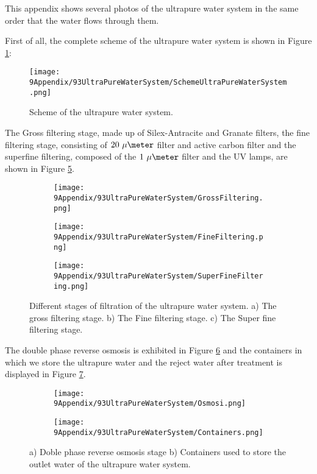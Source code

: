 This appendix shows several photos of the ultrapure water system in the same order that the water flows through them.

First of all, the complete scheme of the ultrapure water system is shown in Figure \ref{fig:SchemeUPWS}:

\begin{figure}[htbp]
\centering
\texttt{[image: 9Appendix/93UltraPureWaterSystem/SchemeUltraPureWaterSystem.png]}
\caption{Scheme of the ultrapure water system.\label{fig:SchemeUPWS}}
\end{figure}

The Gross filtering stage, made up of Silex-Antracite and Granate filters, the fine filtering stage, consisting of $20~\mu\meter$ filter and active carbon filter and the superfine filtering, composed of the $1~\mu\meter$ filter and the UV lamps, are shown in Figure \ref{fig:UltraPureWaterStages}.

\begin{figure}
\centering
    \begin{subfigure}[b]{0.3\textwidth}
    \centering
    \texttt{[image: 9Appendix/93UltraPureWaterSystem/GrossFiltering.png]}  
    \caption{\label{subfig:GrossFiltering}}
    \end{subfigure}
    \hfill
    \begin{subfigure}[b]{0.3\textwidth}
    \centering
    \texttt{[image: 9Appendix/93UltraPureWaterSystem/FineFiltering.png]}  
    \caption{\label{subfig:FineFiltering}}
    \end{subfigure}
    \hfill
    \begin{subfigure}[b]{0.3\textwidth}
    \centering
    \texttt{[image: 9Appendix/93UltraPureWaterSystem/SuperFineFiltering.png]}  
    \caption{\label{subfig:SuperFineFiltering}}
    \end{subfigure}
 \caption{Different stages of filtration of the ultrapure water system. a) The gross filtering stage. b) The Fine filtering stage. c) The Super fine filtering stage.}
 \label{fig:UltraPureWaterStages}
\end{figure}

The double phase reverse osmosis is exhibited in Figure \ref{subfig:Osmosi} and the containers in which we store the ultrapure water and the reject water after treatment is displayed in Figure \ref{subfig:Containers}.

\begin{figure}
\centering
    \begin{subfigure}[b]{0.3\textwidth}
    \centering
    \texttt{[image: 9Appendix/93UltraPureWaterSystem/Osmosi.png]}  
    \caption{\label{subfig:Osmosi}}
    \end{subfigure}
    \hfill
    \begin{subfigure}[b]{0.5\textwidth}
    \centering
    \texttt{[image: 9Appendix/93UltraPureWaterSystem/Containers.png]}  
    \caption{\label{subfig:Containers}}
    \end{subfigure}
 \caption{a) Doble phase reverse osmosis stage b) Containers used to store the outlet water of the ultrapure water system.}
 \label{subfig:OsmosisContainers}
\end{figure}

